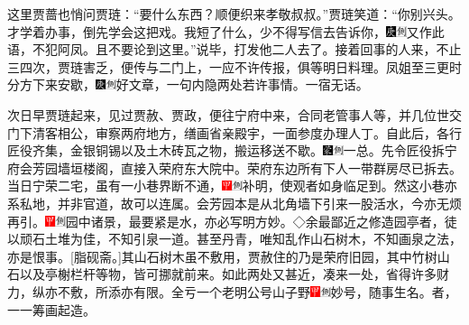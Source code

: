 这里贾蔷也悄问贾琏：``要什么东西？顺便织来孝敬叔叔。''贾琏笑道：``你别兴头。才学着办事，倒先学会这把戏。我短了什么，少不得写信去告诉你，{\includegraphics[width=3mm]{../Images/00004}\includegraphics[width=3mm]{../Images/00011}\footnotesize \kaishu 又作此语，不犯阿凤。}且不要论到这里。''说毕，打发他二人去了。接着回事的人来，不止三四次，贾琏害乏，便传与二门上，一应不许传报，俱等明日料理。凤姐至三更时分方下来安歇，{\includegraphics[width=3mm]{../Images/00004}\includegraphics[width=3mm]{../Images/00011}\footnotesize \kaishu 好文章，一句内隐两处若许事情。}一宿无话。

次日早贾琏起来，见过贾赦、贾政，便往宁府中来，合同老管事人等，并几位世交门下清客相公，审察两府地方，缮画省亲殿宇，一面参度办理人丁。自此后，各行匠役齐集，金银铜锡以及土木砖瓦之物，搬运移送不歇。{\includegraphics[width=3mm]{../Images/00006}\includegraphics[width=3mm]{../Images/00011}\footnotesize \kaishu 一总。}先令匠役拆宁府会芳园墙垣楼阁，直接入荣府东大院中。荣府东边所有下人一带群房尽已拆去。当日宁荣二宅，虽有一小巷界断不通，{\includegraphics[width=3mm]{../Images/00002}\includegraphics[width=3mm]{../Images/00011}\footnotesize \kaishu 补明，使观者如身临足到。}然这小巷亦系私地，并非官道，故可以连属。会芳园本是从北角墙下引来一股活水，今亦无烦再引。{\includegraphics[width=3mm]{../Images/00002}\includegraphics[width=3mm]{../Images/00011}\footnotesize \kaishu 园中诸景，最要紧是水，亦必写明方妙。◇余最鄙近之修造园亭者，徒以顽石土堆为佳，不知引泉一道。甚至丹青，唯知乱作山石树木，不知画泉之法，亦是恨事。{[}脂砚斋。{]}}其山石树木虽不敷用，贾赦住的乃是荣府旧园，其中竹树山石以及亭榭栏杆等物，皆可挪就前来。如此两处又甚近，凑来一处，省得许多财力，纵亦不敷，所添亦有限。全亏一个老明公号山子野{\includegraphics[width=3mm]{../Images/00002}\includegraphics[width=3mm]{../Images/00011}\footnotesize \kaishu 妙号，随事生名。}者，一一筹画起造。

